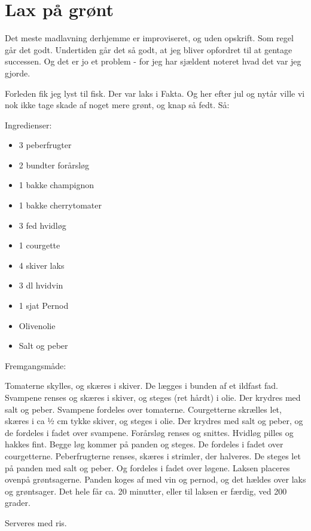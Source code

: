\documentclass[
]{book}
\providecommand{\tightlist}{%
  \setlength{\itemsep}{0pt}\setlength{\parskip}{0pt}}
\begin{document}
\hypertarget{lax-puxe5-gruxf8nt}{%
\section{Lax på grønt}\label{lax-puxe5-gruxf8nt}}

Det meste madlavning derhjemme er improviseret, og uden opskrift. Som regel går det godt. Undertiden går det så godt, at jeg bliver opfordret til at gentage successen. Og det er jo et problem - for jeg har sjældent noteret hvad det var jeg gjorde.

Forleden fik jeg lyst til fisk. Der var laks i Fakta. Og her efter jul og nytår ville vi nok ikke tage skade af noget mere grønt, og knap så fedt. Så:

Ingredienser:

\begin{itemize}
\tightlist
\item
  3 peberfrugter
\item
  2 bundter forårsløg
\item
  1 bakke champignon
\item
  1 bakke cherrytomater
\item
  3 fed hvidløg
\item
  1 courgette
\item
  4 skiver laks
\item
  3 dl hvidvin
\item
  1 sjat Pernod
\item
  Olivenolie
\item
  Salt og peber
\end{itemize}

Fremgangsmåde:

Tomaterne skylles, og skæres i skiver. De lægges i bunden af et ildfast fad.
Svampene renses og skæres i skiver, og steges (ret hårdt) i olie. Der krydres med salt og peber.
Svampene fordeles over tomaterne.
Courgetterne skrælles let, skæres i ca ½ cm tykke skiver, og steges i olie. Der krydres med salt og peber, og de fordeles i fadet over svampene.
Forårsløg renses og snittes.
Hvidløg pilles og hakkes fint.
Begge løg kommer på panden og steges. De fordeles i fadet over courgetterne.
Peberfrugterne renses, skæres i strimler, der halveres. De steges let på panden med salt og peber. Og fordeles i fadet over løgene.
Laksen placeres ovenpå grøntsagerne.
Panden koges af med vin og pernod, og det hældes over laks og grøntsager.
Det hele får ca. 20 minutter, eller til laksen er færdig, ved 200 grader.

Serveres med ris.
\end{document}
